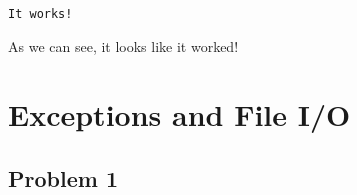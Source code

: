 \documentclass[11pt]{article}
\begin{document}
    \begin{Verbatim}[commandchars=\\\{\}]
It works!

    \end{Verbatim}

    As we can see, it looks like it worked!

    \section{Exceptions and File I/O}\label{exceptions-and-file-io}

    \subsection*{Problem 1}\label{problem-1}
\end{document}
